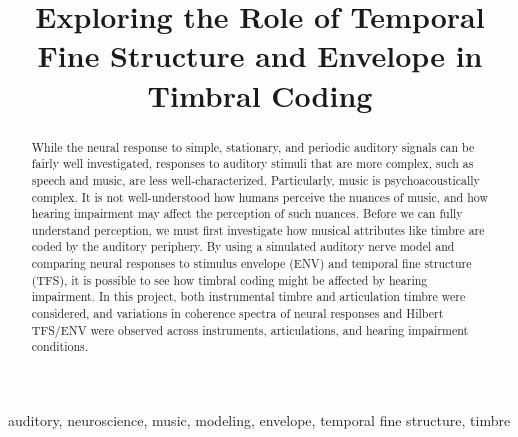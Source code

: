 \documentclass[conference]{IEEEtran}
\begin{document}
\title{Exploring the Role of Temporal Fine Structure and Envelope in Timbral Coding}

\author{
}

\maketitle

\begin{abstract}
While the neural response to simple, stationary, and periodic auditory signals can be fairly well investigated, responses to auditory stimuli that are more complex, such as speech and music, are less well-characterized. Particularly, music is psychoacoustically complex. It is not well-understood how humans perceive the nuances of music, and how hearing impairment may affect the perception of such nuances. Before we can fully understand perception, we must first investigate how musical attributes like timbre are coded by the auditory periphery. By using a simulated auditory nerve model and comparing neural responses to stimulus envelope (ENV) and temporal fine structure (TFS), it is possible to see how timbral coding might be affected by hearing impairment. In this project, both instrumental timbre and articulation timbre were considered, and variations in coherence spectra of neural responses and Hilbert TFS/ENV were observed across instruments, articulations, and hearing impairment conditions.
\end{abstract}\vspace{1em}

\begin{IEEEkeywords}
auditory, neuroscience, music, modeling, envelope, temporal fine structure, timbre
\end{IEEEkeywords}
\end{document}

